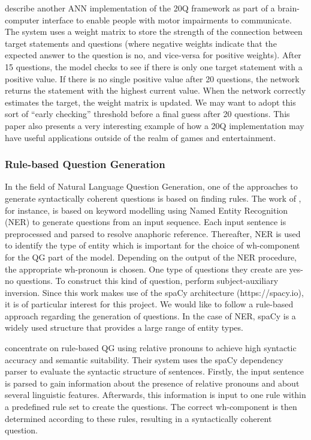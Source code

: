\documentclass[a4paper,12pt]{article}
\begin{document}
\citet{ToninEa2018} describe another ANN implementation of the 20Q framework as part of a brain-computer interface to enable people with motor impairments to communicate. 
The system uses a weight matrix to store the strength of the connection between target statements and questions (where negative weights indicate that the expected answer to the question is no, and vice-versa for positive weights). 
After 15 questions, the model checks to see if there is only one target statement with a positive value. 
If there is no single positive value after 20 questions, the network returns the statement with the highest current value. 
When the network correctly estimates the target, the weight matrix is updated. 
We may want to adopt this sort of ``early checking'' threshold before a final guess after 20 questions. 
This paper also presents a very interesting example of how a 20Q implementation may have useful applications outside of the realm of games and entertainment.

\subsubsection*{Rule-based Question Generation}
In the field of Natural Language Question Generation, one of the approaches to generate syntactically coherent questions is based on finding rules. 
The work of \citet{MhatreEa2019}, for instance, is based on keyword modelling using Named Entity Recognition (NER) to generate questions from an input sequence. 
Each input sentence is preprocessed and parsed to resolve anaphoric reference. 
Thereafter, NER is used to identify the type of entity which is important for the choice of wh-component for the QG part of the model. 
Depending on the output of the NER procedure, the appropriate wh-pronoun is chosen. 
One type of questions they create are yes-no questions. 
To construct this kind of question, \citet{MhatreEa2019} perform subject-auxiliary inversion. 
Since this work makes use of the spaCy architecture (https://spacy.io), it is of particular interest for this project. 
We would like to follow a rule-based approach regarding the generation of questions. 
In the case of NER, spaCy is a widely used structure that provides a large range of entity types. 

\citet{KhullarEa2018} concentrate on rule-based QG using relative pronouns to achieve high syntactic accuracy and semantic suitability. 
Their system uses the spaCy dependency parser to evaluate the syntactic structure of sentences. 
Firstly, the input sentence is parsed to gain information about the presence of relative pronouns and about several linguistic features. 
Afterwards, this information is input to one rule within a predefined rule set to create the questions. 
The correct wh-component is then determined according to these rules, resulting in a syntactically coherent question. 
\end{document}
